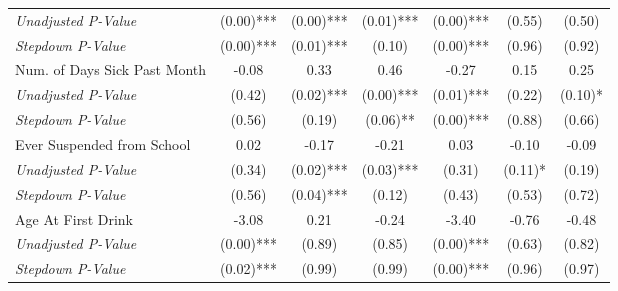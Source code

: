 \begin{tabular}{l c c c c c c}
\quad \textit{Unadjusted P-Value} & (0.00)*** & (0.00)*** & (0.01)*** & (0.00)*** & (0.55) & (0.50) \\
\quad \textit{Stepdown P-Value} & (0.00)*** & (0.01)*** & (0.10) & (0.00)*** & (0.96) & (0.92) \\
Num. of Days Sick Past Month & -0.08 & 0.33 & 0.46 & -0.27 & 0.15 & 0.25 \\
\quad \textit{Unadjusted P-Value} & (0.42) & (0.02)*** & (0.00)*** & (0.01)*** & (0.22) & (0.10)* \\
\quad \textit{Stepdown P-Value} & (0.56) & (0.19) & (0.06)** & (0.00)*** & (0.88) & (0.66) \\
Ever Suspended from School & 0.02 & -0.17 & -0.21 & 0.03 & -0.10 & -0.09 \\
\quad \textit{Unadjusted P-Value} & (0.34) & (0.02)*** & (0.03)*** & (0.31) & (0.11)* & (0.19) \\
\quad \textit{Stepdown P-Value} & (0.56) & (0.04)*** & (0.12) & (0.43) & (0.53) & (0.72) \\
Age At First Drink & -3.08 & 0.21 & -0.24 & -3.40 & -0.76 & -0.48 \\
\quad \textit{Unadjusted P-Value} & (0.00)*** & (0.89) & (0.85) & (0.00)*** & (0.63) & (0.82) \\
\quad \textit{Stepdown P-Value} & (0.02)*** & (0.99) & (0.99) & (0.00)*** & (0.96) & (0.97) \\
\bottomrule
\end{tabular}
